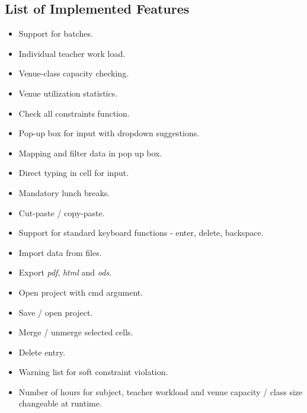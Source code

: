\subsection{List of Implemented Features}
\noindent
\begin{itemize}
\item Support for batches.
\item Individual teacher work load.
\item Venue-class capacity checking.
\item Venue utilization statistics.
\item Check all constraints function.
\item Pop-up box for input with dropdown suggestions.
\item Mapping and filter data in pop up box.
\item Direct typing in cell for input.
\item Mandatory lunch breaks.
\item Cut-paste / copy-paste.
\item Support for standard keyboard functions - enter, delete, backspace.
\item Import data from files.
\item Export \textit{pdf}, \textit{html} and \textit{ods}.
\item Open project with cmd argument. 
\item Save / open project.
\item Merge / unmerge selected cells.
\item Delete entry.
\item Warning list for soft constraint violation.
\item Number of hours for subject, teacher workload and venue capacity / class size changeable at runtime.

\end{itemize}
 
 
